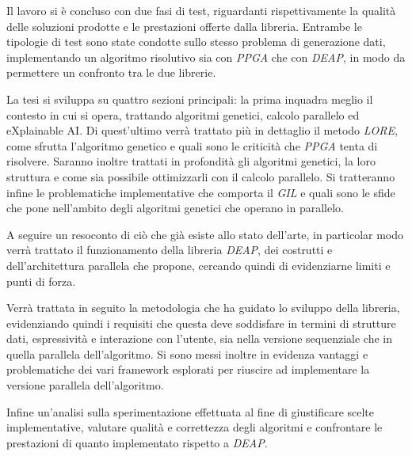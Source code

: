 Il lavoro si è concluso con due fasi di test, riguardanti rispettivamente la
qualità delle soluzioni prodotte e le prestazioni offerte dalla libreria.
Entrambe le tipologie di test sono state condotte sullo stesso problema di
generazione dati, implementando un algoritmo risolutivo sia con \textit{PPGA}
che con \textit{DEAP}, in modo da permettere un confronto tra le due librerie.

La tesi si sviluppa su quattro sezioni principali: la prima inquadra meglio il
contesto in cui si opera, trattando algoritmi genetici, calcolo parallelo ed
eXplainable AI. Di quest'ultimo verrà trattato più in dettaglio il metodo
\textit{LORE}, come sfrutta l'algoritmo genetico e quali sono le criticità che
\textit{PPGA} tenta di risolvere. Saranno inoltre trattati in profondità gli
algoritmi genetici, la loro struttura e come sia possibile ottimizzarli con il
calcolo parallelo. Si tratteranno infine le problematiche implementative che
comporta il \textit{GIL} e quali sono le sfide che pone nell'ambito degli
algoritmi genetici che operano in parallelo.

A seguire un resoconto di ciò che già esiste allo stato dell'arte, in particolar
modo verrà trattato il funzionamento della libreria \textit{DEAP}, dei costrutti
e dell'architettura parallela che propone, cercando quindi di evidenziarne
limiti e punti di forza.

Verrà trattata in seguito la metodologia che ha guidato lo sviluppo della
libreria, evidenziando quindi i requisiti che questa deve soddisfare in termini
di strutture dati, espressività e interazione con l'utente, sia nella versione
sequenziale che in quella parallela dell'algoritmo. Si sono messi inoltre in
evidenza vantaggi e problematiche dei vari framework esplorati per riuscire ad
implementare la versione parallela dell'algoritmo.

Infine un'analisi sulla sperimentazione effettuata al fine di giustificare
scelte implementative, valutare qualità e correttezza degli algoritmi e
confrontare le prestazioni di quanto implementato rispetto a \textit{DEAP}.

